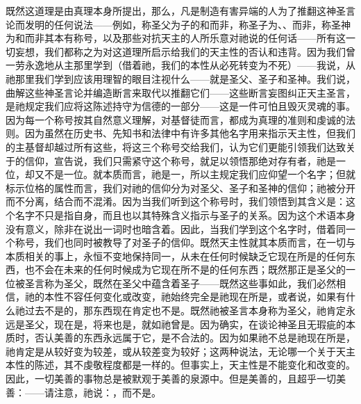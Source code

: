 既然这道理是由真理本身所提出，那么，凡是制造有害异端的人为了推翻这神圣言论而发明的任何说法——例如，称圣父为子的和而非，称圣子为、、而非，称圣神为和而非其本有称号，以及那些对抗天主的人所乐意对祂说的任何话——所有这一切妄想，我们都称之为对这道理所启示给我们的天主性的否认和违背。因为我们曾一劳永逸地从主那里学到（借着祂，我们的本性从必死转变为不死）——我说，从祂那里我们学到应该用理智的眼目注视什么——就是圣父、圣子和圣神。我们说，曲解这些神圣言论并编造断言来取代以推翻它们——这些断言妄图纠正天主圣言，是祂规定我们应将这陈述持守为信德的一部分——这是一件可怕且毁灭灵魂的事。因为每一个称号按其自然意义理解，对基督徒而言，都成为真理的准则和虔诚的法则。因为虽然在历史书、先知书和法律中有许多其他名字用来指示天主性，但我们的主基督却越过所有这些，将这三个称号交给我们，认为它们更能引领我们达致关于的信仰，宣告说，我们只需紧守这个称号，就足以领悟那绝对存有者，祂是一位，却又不是一位。就本质而言，祂是一，所以主规定我们应仰望一个名字；但就标示位格的属性而言，我们对祂的信仰分为对圣父、圣子和圣神的信仰；祂被分开而不分离，结合而不混淆。因为当我们听到这个称号时，我们领悟到其含义是：这个名字不只是指自身，而且也以其特殊含义指示与圣子的关系。因为这个术语本身没有意义，除非在说出一词时也暗含着。因此，当我们学到这个名字时，借着同一个称号，我们也同时被教导了对圣子的信仰。既然天主性就其本质而言，在一切与本质相关的事上，永恒不变地保持同一，从未在任何时候缺乏它现在所是的任何东西，也不会在未来的任何时候成为它现在所不是的任何东西；既然那正是圣父的一位被圣言称为圣父，既然在圣父中蕴含着圣子——既然这些事如此，我们必然相信，祂的本性不容任何变化或改变，祂始终完全是祂现在所是，或者说，如果有什么祂过去不是的，那东西现在肯定也不是。既然祂被圣言本身称为圣父，祂肯定永远是圣父，现在是，将来也是，就如祂曾是。因为确实，在谈论神圣且无瑕疵的本质时，否认美善的东西永远属于它，是不合法的。因为如果祂不总是祂现在所是，祂肯定是从较好变为较差，或从较差变为较好；这两种说法，无论哪一个关于天主本性的陈述，其不虔敬程度都是一样的。但事实上，天主性是不能变化和改变的。因此，一切美善的事物总是被默观于美善的泉源中。但是美善的，且超乎一切美善：——请注意，祂说：，而不是。\par

